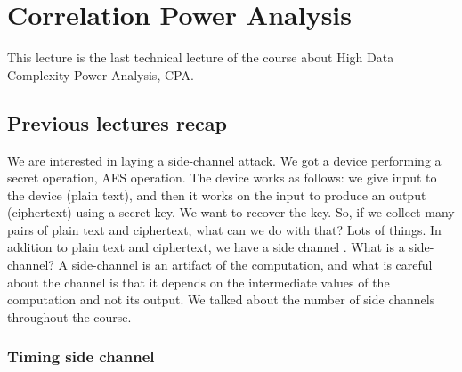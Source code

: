 \chapter{Correlation Power Analysis} \label{c8_fifthcapter}

This lecture is the last technical lecture of the course about High Data
Complexity Power Analysis, CPA.

\section{Previous lectures recap}\label{c8_prev_lectures_recap:sec}

We are interested in laying a side-channel attack. We got a device performing
a secret operation, AES operation. The device works as follows: we give input to
the device (plain text), and then it works on the input to produce an output
(ciphertext) using a secret key. We want to recover the key. So, if we collect
many pairs of plain text and ciphertext, what can we do with that? Lots of
things. In addition to plain text and ciphertext, we have a side channel \cite{SideChannel}. What
is a side-channel? A side-channel is an artifact of the computation, and what is
careful about the channel is that it depends on the intermediate values of the
computation and not its output. We talked about the number of side channels
throughout the course.

\subsection{Timing side channel}\label{c8_prev_lectures_recap_timing_sc:subsec}

